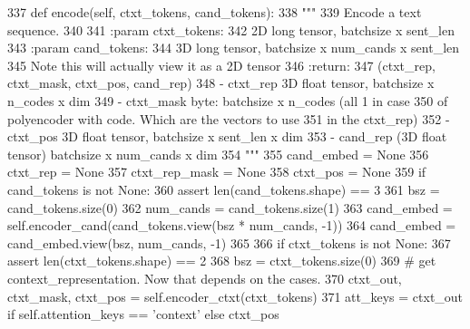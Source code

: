 \begin{DoxyCode}
337     \textcolor{keyword}{def }encode(self, ctxt\_tokens, cand\_tokens):
338         \textcolor{stringliteral}{"""}
339 \textcolor{stringliteral}{        Encode a text sequence.}
340 \textcolor{stringliteral}{}
341 \textcolor{stringliteral}{        :param ctxt\_tokens:}
342 \textcolor{stringliteral}{            2D long tensor, batchsize x sent\_len}
343 \textcolor{stringliteral}{        :param cand\_tokens:}
344 \textcolor{stringliteral}{            3D long tensor, batchsize x num\_cands x sent\_len}
345 \textcolor{stringliteral}{            Note this will actually view it as a 2D tensor}
346 \textcolor{stringliteral}{        :return:}
347 \textcolor{stringliteral}{            (ctxt\_rep, ctxt\_mask, ctxt\_pos, cand\_rep)}
348 \textcolor{stringliteral}{            - ctxt\_rep 3D float tensor, batchsize x n\_codes x dim}
349 \textcolor{stringliteral}{            - ctxt\_mask byte:  batchsize x n\_codes (all 1 in case}
350 \textcolor{stringliteral}{            of polyencoder with code. Which are the vectors to use}
351 \textcolor{stringliteral}{            in the ctxt\_rep)}
352 \textcolor{stringliteral}{            - ctxt\_pos 3D float tensor, batchsize x sent\_len x dim}
353 \textcolor{stringliteral}{            - cand\_rep (3D float tensor) batchsize x num\_cands x dim}
354 \textcolor{stringliteral}{        """}
355         cand\_embed = \textcolor{keywordtype}{None}
356         ctxt\_rep = \textcolor{keywordtype}{None}
357         ctxt\_rep\_mask = \textcolor{keywordtype}{None}
358         ctxt\_pos = \textcolor{keywordtype}{None}
359         \textcolor{keywordflow}{if} cand\_tokens \textcolor{keywordflow}{is} \textcolor{keywordflow}{not} \textcolor{keywordtype}{None}:
360             \textcolor{keyword}{assert} len(cand\_tokens.shape) == 3
361             bsz = cand\_tokens.size(0)
362             num\_cands = cand\_tokens.size(1)
363             cand\_embed = self.encoder\_cand(cand\_tokens.view(bsz * num\_cands, -1))
364             cand\_embed = cand\_embed.view(bsz, num\_cands, -1)
365 
366         \textcolor{keywordflow}{if} ctxt\_tokens \textcolor{keywordflow}{is} \textcolor{keywordflow}{not} \textcolor{keywordtype}{None}:
367             \textcolor{keyword}{assert} len(ctxt\_tokens.shape) == 2
368             bsz = ctxt\_tokens.size(0)
369             \textcolor{comment}{# get context\_representation. Now that depends on the cases.}
370             ctxt\_out, ctxt\_mask, ctxt\_pos = self.encoder\_ctxt(ctxt\_tokens)
371             att\_keys = ctxt\_out \textcolor{keywordflow}{if} self.attention\_keys == \textcolor{stringliteral}{'context'} \textcolor{keywordflow}{else} ctxt\_pos

\end{DoxyCode}
